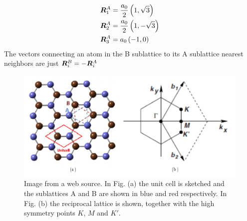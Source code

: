 \begin{align}
\boldsymbol{R}^A_1 &= \frac{a_0}{2} \left( 1, \sqrt{3} \right) \\
\boldsymbol{R}^A_2 &= \frac{a_0}{2} \left( 1, -\sqrt{3} \right) \\
\boldsymbol{R}^A_3 &= a_0 \left( -1, 0 \right)
\end{align}
The vectors connecting an atom in the B sublattice to its A sublattice nearest neighbors are just $\boldsymbol{R}^B_i = -\boldsymbol{R}^A_i$

\begin{figure}
\centering
  \includegraphics[width=0.7\linewidth]{../Figures/honeycomb_lattice.png}
  \caption{Image from a web source. In Fig. (a) the unit cell is sketched and the sublattices A and B are shown in blue and red respectively. In Fig. (b) the reciprocal lattice is shown, together with the high symmetry points $K$, $M$ and $K'$.} 
\label{Fig2.2}
\end{figure}

